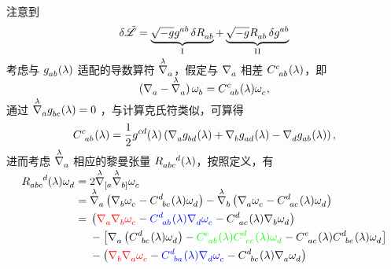 \begin{Proof}
			注意到
			\begin{equation}
				\var{\Lad} = \underbrace{\sqrt{-g} \tensor{g}{^a^b} \var{\tensor{R}{_a_b}}}_{\RomanNumeralCaps{1}} + \underbrace{\sqrt{-g} \tensor{R}{_a_b} \var{\tensor{g}{^a^b}}}_{\RomanNumeralCaps{2}}
			\end{equation}
			考虑与 $\tensor{g}{_a_b}(\lambda)$ 适配的导数算符 $\tensor{\myvaried{\nabla}}{_a}$，假定与 $\Nabla{a}$ 相差 $\tensor{C}{^c_a_b}(\lambda)$，即
			\begin{equation}
				\left( \Nabla{a} - \tensor{\myvaried{\nabla}}{_a} \right) \tensor{\omega}{_b} = \tensor{C}{^c_a_b}(\lambda) \tensor{\omega}{_c},
			\end{equation}
			通过 $\tensor{\myvaried{\nabla}}{_a} \tensor{g}{_b_c}(\lambda) = 0$ ，与计算克氏符类似，可算得
			\begin{equation}
				\tensor{C}{^c_a_b}(\lambda) = \frac{1}{2} \tensor{g}{^c^d}(\lambda) \left( \Nabla{a} \tensor{g}{_b_d}(\lambda) + \Nabla{b} \tensor{g}{_a_d}(\lambda) - \Nabla{d} \tensor{g}{_a_b}(\lambda) \right),\label{eq-Clambda}
			\end{equation}
			进而考虑 $\tensor{\myvaried{\nabla}}{_a}$ 相应的黎曼张量 $\tensor{R}{_a_b_c^d}(\lambda)$，按照定义，有
			\begin{equation}
				\begin{split}
					\tensor{R}{_a_b_c^d}(\lambda) \tensor{\omega}{_d} ={}& 2 \tensor{\myvaried{\nabla}}{_{[a}} \tensor{\myvaried{\nabla}}{_{b]}} \tensor{\omega}{_c}\\
					={}& \tensor{\myvaried{\nabla}}{_a} \left( \Nabla{b} \tensor{\omega}{_c} - \tensor{C}{^d_b_c}(\lambda) \tensor{\omega}{_d} \right) - \tensor{\myvaried{\nabla}}{_b} \left( \Nabla{a} \tensor{\omega}{_c} - \tensor{C}{^d_a_c}(\lambda) \tensor{\omega}{_d} \right)\\
					={}& \left( {\color{red}\Nabla{a} \Nabla{b}\tensor{\omega}{_c}} - {\color{blue}\tensor{C}{^d_a_b}(\lambda) \Nabla{d} \tensor{\omega}{_c}} - \tensor{C}{^d_a_c}(\lambda) \Nabla{b} \tensor{\omega}{_d} \right)\\
					& {}- \left[ \Nabla{a} \left( \tensor{C}{^d_b_c}(\lambda) \tensor{\omega}{_d} \right) - {\color{green}\tensor{C}{^e_a_b}(\lambda) \tensor{C}{^d_e_c}(\lambda) \tensor{\omega}{_d}} - \tensor{C}{^e_a_c}(\lambda) \tensor{C}{^d_b_e}(\lambda) \tensor{\omega}{_d} \right]\\
					& {}- \left( {\color{red}\Nabla{b} \Nabla{a}\tensor{\omega}{_c}} - {\color{blue}\tensor{C}{^d_b_a}(\lambda) \Nabla{d} \tensor{\omega}{_c}} - \tensor{C}{^d_b_c}(\lambda) \Nabla{a} \tensor{\omega}{_d} \right)\\

\end{split}
\end{equation}
\end{Proof}
